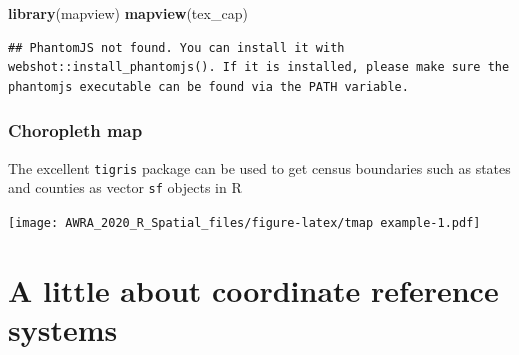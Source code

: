\documentclass[
]{book}
\newenvironment{Shaded}{\begin{snugshade}}{\end{snugshade}}
\newcommand{\DataTypeTok}[1]{\textcolor[rgb]{0.13,0.29,0.53}{#1}}
\newcommand{\KeywordTok}[1]{\textcolor[rgb]{0.13,0.29,0.53}{\textbf{#1}}}
\newcommand{\NormalTok}[1]{#1}
\newcommand{\OperatorTok}[1]{\textcolor[rgb]{0.81,0.36,0.00}{\textbf{#1}}}
\newcommand{\OtherTok}[1]{\textcolor[rgb]{0.56,0.35,0.01}{#1}}
\newcommand{\StringTok}[1]{\textcolor[rgb]{0.31,0.60,0.02}{#1}}
\begin{document}
\begin{Shaded}
\begin{Highlighting}[]
\KeywordTok{library}\NormalTok{(mapview)}
\KeywordTok{mapview}\NormalTok{(tex_cap)}
\end{Highlighting}
\end{Shaded}

\begin{verbatim}
## PhantomJS not found. You can install it with webshot::install_phantomjs(). If it is installed, please make sure the phantomjs executable can be found via the PATH variable.
\end{verbatim}

\hypertarget{htmlwidget-86bd956c9d925816aaf7}{}
\begin{leaflet}

\end{leaflet}

\hypertarget{choropleth-map}{%
\subsection{Choropleth map}\label{choropleth-map}}

The excellent \texttt{tigris} package can be used to get census boundaries such as states and counties as vector \texttt{sf} objects in R

\begin{Shaded}
\end{Shaded}

\texttt{[image: AWRA\_2020\_R\_Spatial\_files/figure-latex/tmap example-1.pdf]}

\hypertarget{a-little-about-coordinate-reference-systems}{%
\chapter{A little about coordinate reference systems}\label{a-little-about-coordinate-reference-systems}}
\end{document}
